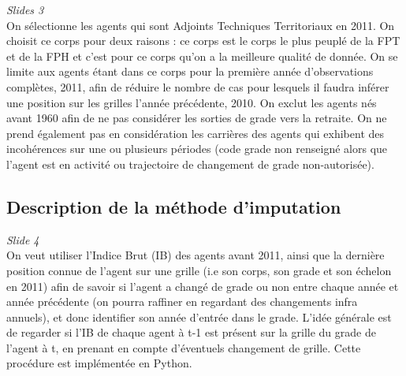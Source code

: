 \documentclass[11pt,a4paper]{article}
\begin{document}
\textit{Slides 3}\\

On sélectionne les agents qui sont Adjoints Techniques Territoriaux en 2011. On choisit ce corps pour deux raisons : ce corps est le corps le plus peuplé de la FPT et de la FPH et c'est pour ce corps qu'on a la meilleure qualité de donnée. On se limite aux agents étant dans ce corps pour la première année d'observations complètes, 2011, afin de réduire le nombre de cas pour lesquels il faudra inférer une position sur les grilles l'année précédente, 2010. On exclut les agents nés avant 1960 afin de ne pas considérer les sorties de grade vers la retraite. On ne prend également pas en considération les carrières des agents qui exhibent des incohérences sur une ou plusieurs périodes (code grade non renseigné alors que l'agent est en activité ou trajectoire de changement de grade non-autorisée).

\subsection{Description de la méthode d'imputation}

\textit{Slide 4}\\

On veut utiliser l'Indice Brut (IB) des agents avant 2011, ainsi que la dernière position connue de l'agent sur une grille (i.e son corps, son grade et son échelon en 2011) afin de savoir si l'agent a changé de grade ou non entre chaque année et année précédente (on pourra raffiner en regardant des changements infra annuels), et donc identifier son année d'entrée dans le grade.
L'idée générale est de regarder si l'IB de chaque agent à t-1 est présent sur la grille du grade de l'agent à t, en prenant en compte d'éventuels changement de grille. Cette procédure est implémentée en Python.\\
\end{document}
